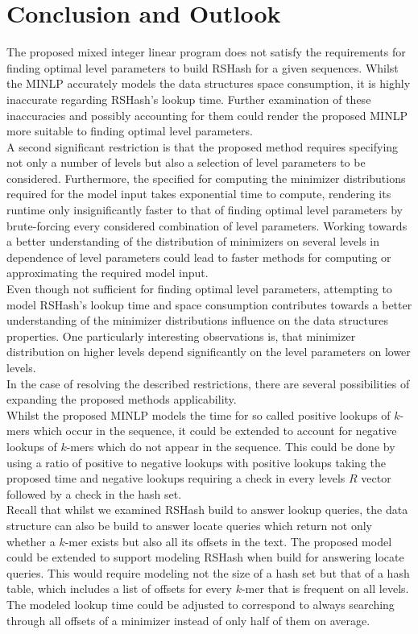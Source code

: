 \documentclass[a4paper,titlepage,onecolumn,oneside,12pt,nenglish,titlepage=firstiscover]{scrbook}
\theoremstyle{plain} %
\theoremstyle{definition} %
\theoremstyle{remark} %
\theoremstyle{plain}
\begin{document}
\chapter{Conclusion and Outlook} \label{chap:outlook}
The proposed mixed integer linear program does not satisfy the requirements for finding optimal level parameters to build RSHash for a given sequences. Whilst the MINLP accurately models the data structures space consumption, it is highly inaccurate regarding RSHash's lookup time. Further examination of these inaccuracies and possibly accounting for them could render the proposed MINLP more suitable to finding optimal level parameters.\\
A second significant restriction is that the proposed method requires specifying not only a number of levels but also a selection of level parameters to be considered. Furthermore, the specified  for computing the minimizer distributions required for the model input takes exponential time to compute, rendering its runtime only insignificantly faster to that of finding optimal level parameters by brute-forcing every considered combination of level parameters. Working towards a better understanding of the distribution of minimizers on several levels in dependence of level parameters could lead to faster methods for computing or approximating the required model input.\\
Even though not sufficient for finding optimal level parameters, attempting to model RSHash's lookup time and space consumption contributes towards a better understanding of the minimizer distributions influence on the data structures properties. One particularly interesting observations is, that minimizer distribution on higher levels depend significantly on the level parameters on lower levels.\\

In the case of resolving the described restrictions, there are several possibilities of expanding the proposed methods applicability.\\
Whilst the proposed MINLP models the time for so called positive lookups of $k$-mers which occur in the sequence, it could be extended to account for negative lookups of $k$-mers which do not appear in the sequence. This could be done by using a ratio of positive to negative lookups with positive lookups taking the proposed time and negative lookups requiring a check in every levels $R$ vector followed by a check in the hash set.\\
Recall that whilst we examined RSHash build to answer lookup queries, the data structure can also be build to answer locate queries which return not only whether a $k$-mer exists but also all its offsets in the text. The proposed model could be extended to support modeling RSHash when build for answering locate queries. This would require modeling not the size of a hash set but that of a hash table, which includes a list of offsets for every $k$-mer that is frequent on all levels. The modeled lookup time could be adjusted to correspond to always searching through all offsets of a minimizer instead of only half of them on average.
\end{document}
